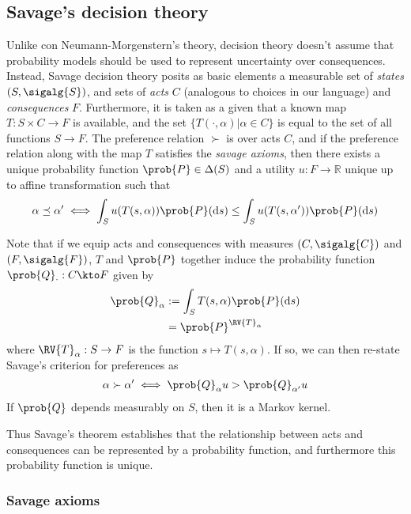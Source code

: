 \subsection{Savage's decision theory}

Unlike con Neumann-Morgenstern's theory, \citet{savage_foundations_1954} decision theory doesn't assume that probability models should be used to represent uncertainty over consequences. Instead, Savage decision theory posits as basic elements a measurable set of \emph{states} $(S,\sigalg{S})$, and sets of \emph{acts} $C$ (analogous to choices in our language) and \emph{consequences} $F$. Furthermore, it is taken as a given that a known map $T:S\times C\to F$ is available, and the set $\{T(\cdot,\alpha)|\alpha\in C\}$ is equal to the set of all functions $S\to F$. The preference relation $\succ$ is over acts $C$, and if the preference relation along with the map $T$ satisfies the \emph{savage axioms}, then there exists a unique probability function $\prob{P}\in \Delta(S)$ and a utility $u:F\to \mathbb{R}$ unique up to affine transformation such that
\begin{align}
    \alpha\preceq \alpha' \iff \int_S u(T(s,\alpha))\prob{P}(\mathrm{d}s) \leq \int_S u(T(s,\alpha'))\prob{P}(\mathrm{d}s)
\end{align}

Note that if we equip acts and consequences with measures $(C,\sigalg{C})$ and $(F,\sigalg{F})$, $T$ and $\prob{P}$ together induce the probability function $\prob{Q}_\cdot:C\kto F$ given by
\begin{align}
    \prob{Q}_\alpha &:= \int_S T(s,\alpha)\prob{P}(\mathrm{d}s)\\
                    &=\prob{P}^{\RV{T}_\alpha}
\end{align}
where $\RV{T}_\alpha:S\to F$ is the function $s\mapsto T(s,\alpha)$. If so, we can then re-state Savage's criterion for preferences as
\begin{align}
    \alpha\succ \alpha' \iff \prob{Q}_\alpha u > \prob{Q}_{\alpha'} u
\end{align}
 If $\prob{Q}$ depends measurably on $S$, then it is a Markov kernel.

Thus Savage's theorem establishes that the relationship between acts and consequences can be represented by a probability function, and furthermore this probability function is unique. 

\subsubsection{Savage axioms}

